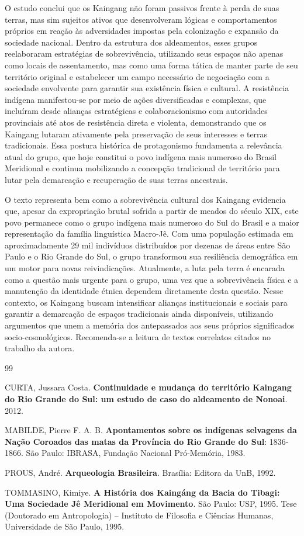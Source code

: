 \documentclass[12pt, a4paper]{article}
\begin{document}
O estudo conclui que os Kaingang não foram passivos frente à perda de suas terras, mas sim sujeitos ativos que desenvolveram lógicas e comportamentos próprios em reação às adversidades impostas pela colonização e expansão da sociedade nacional. Dentro da estrutura dos aldeamentos, esses grupos reelaboraram estratégias de sobrevivência, utilizando seus espaços não apenas como locais de assentamento, mas como uma forma tática de manter parte de seu território original e estabelecer um campo necessário de negociação com a sociedade envolvente para garantir sua existência física e cultural. A resistência indígena manifestou-se por meio de ações diversificadas e complexas, que incluíram desde alianças estratégicas e colaboracionismo com autoridades provinciais até atos de resistência direta e violenta, demonstrando que os Kaingang lutaram ativamente pela preservação de seus interesses e terras tradicionais. Essa postura histórica de protagonismo fundamenta a relevância atual do grupo, que hoje constitui o povo indígena mais numeroso do Brasil Meridional e continua mobilizando a concepção tradicional de território para lutar pela demarcação e recuperação de suas terras ancestrais.

O texto representa bem como a sobrevivência cultural dos Kaingang evidencia que, apesar da expropriação brutal sofrida a partir de meados do século XIX, este povo permanece como o grupo indígena mais numeroso do Sul do Brasil e a maior representação da família linguística Macro-Jê. Com uma população estimada em aproximadamente 29 mil indivíduos distribuídos por dezenas de áreas entre São Paulo e o Rio Grande do Sul, o grupo transformou sua resiliência demográfica em um motor para novas reivindicações. Atualmente, a luta pela terra é encarada como a questão mais urgente para o grupo, uma vez que a sobrevivência física e a manutenção da identidade étnica dependem diretamente desta questão. Nesse contexto, os Kaingang buscam intensificar alianças institucionais e sociais para garantir a demarcação de espaços tradicionais ainda disponíveis, utilizando argumentos que unem a memória dos antepassados aos seus próprios significados socio-cosmológicos. Recomenda-se a leitura de textos correlatos citados no trabalho da autora.

\begin{thebibliography}{99}

	CURTA, Jussara Costa. \textbf{Continuidade e mudança do território Kaingang do Rio Grande do Sul: um estudo de caso do aldeamento de Nonoai}. 2012.

	MABILDE, Pierre F. A. B. \textbf{Apontamentos sobre os indígenas selvagens da Nação Coroados das matas da Província do Rio Grande do Sul}: 1836-1866. São Paulo: IBRASA, Fundação Nacional Pró-Memória, 1983.

	PROUS, André. \textbf{Arqueologia Brasileira}. Brasília: Editora da UnB, 1992.

	TOMMASINO,  Kimiye.  \textbf{A  História  dos  Kaingáng  da  Bacia  do  Tibagi:  Uma  Sociedade Jê Meridional em Movimento}. São Paulo: USP, 1995. Tese (Doutorado  em Antropologia) – Instituto de Filosofia e Ciências Humanas, Universidade de São  Paulo, 1995. 
\end{thebibliography}
\end{document}
